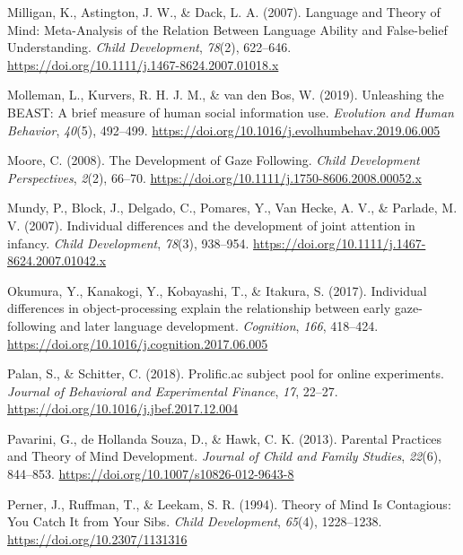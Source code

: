 \documentclass[
  man,floatsintext]{apa7}
\newlength{\cslhangindent}
\newlength{\cslentryspacingunit} %
\newenvironment{CSLReferences}[2] %
 {%
  \setlength{\parindent}{0pt}
  \ifodd #1
  \let\oldpar\par
  \def\par{\hangindent=\cslhangindent\oldpar}
  \fi
  \setlength{\parskip}{#2\cslentryspacingunit}
 }%
 {}
\begin{document}
\begin{CSLReferences}{1}{0}
\leavevmode{}%
Milligan, K., Astington, J. W., \& Dack, L. A. (2007). Language and {Theory} of {Mind}: {Meta-Analysis} of the {Relation Between Language Ability} and {False-belief Understanding}. \emph{Child Development}, \emph{78}(2), 622--646. \url{https://doi.org/10.1111/j.1467-8624.2007.01018.x}

\leavevmode{}%
Molleman, L., Kurvers, R. H. J. M., \& van den Bos, W. (2019). Unleashing the {BEAST}: A brief measure of human social information use. \emph{Evolution and Human Behavior}, \emph{40}(5), 492--499. \url{https://doi.org/10.1016/j.evolhumbehav.2019.06.005}

\leavevmode{}%
Moore, C. (2008). The {Development} of {Gaze Following}. \emph{Child Development Perspectives}, \emph{2}(2), 66--70. \url{https://doi.org/10.1111/j.1750-8606.2008.00052.x}

\leavevmode{}%
Mundy, P., Block, J., Delgado, C., Pomares, Y., Van Hecke, A. V., \& Parlade, M. V. (2007). Individual differences and the development of joint attention in infancy. \emph{Child Development}, \emph{78}(3), 938--954. \url{https://doi.org/10.1111/j.1467-8624.2007.01042.x}

\leavevmode{}%
Okumura, Y., Kanakogi, Y., Kobayashi, T., \& Itakura, S. (2017). Individual differences in object-processing explain the relationship between early gaze-following and later language development. \emph{Cognition}, \emph{166}, 418--424. \url{https://doi.org/10.1016/j.cognition.2017.06.005}

\leavevmode{}%
Palan, S., \& Schitter, C. (2018). Prolific.ac subject pool for online experiments. \emph{Journal of Behavioral and Experimental Finance}, \emph{17}, 22--27. \url{https://doi.org/10.1016/j.jbef.2017.12.004}

\leavevmode{}%
Pavarini, G., de Hollanda Souza, D., \& Hawk, C. K. (2013). Parental {Practices} and {Theory} of {Mind Development}. \emph{Journal of Child and Family Studies}, \emph{22}(6), 844--853. \url{https://doi.org/10.1007/s10826-012-9643-8}

\leavevmode{}%
Perner, J., Ruffman, T., \& Leekam, S. R. (1994). Theory of {Mind Is Contagious}: {You Catch It} from {Your Sibs}. \emph{Child Development}, \emph{65}(4), 1228--1238. \url{https://doi.org/10.2307/1131316}


\end{CSLReferences}
\end{document}
